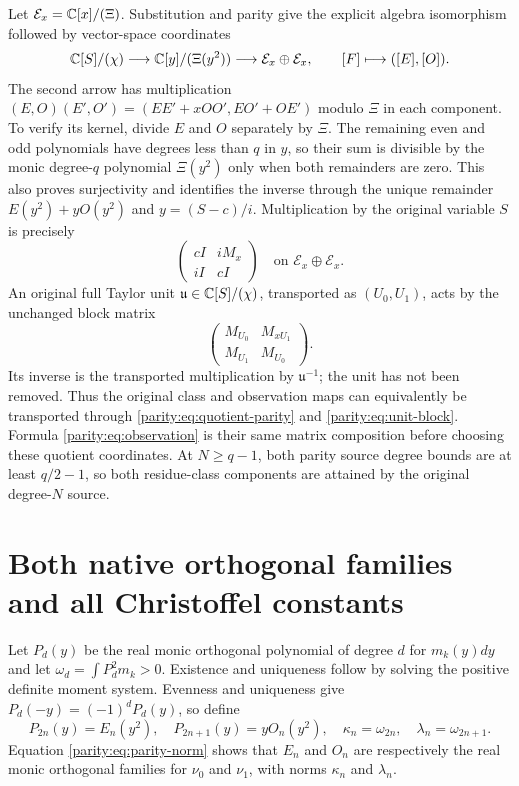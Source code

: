 \documentclass[11pt]{article}
\begin{document}
Let $\mathcal E_x=\mathbb C[x]/(\Xi)$. Substitution and parity give the
explicit algebra isomorphism followed by vector-space coordinates
\begin{equation}\label{parity:eq:quotient-parity}
 \mathbb C[S]/(\chi)\longrightarrow\mathbb C[y]/(\Xi(y^2))
                  \longrightarrow\mathcal E_x\oplus\mathcal E_x,
 \qquad [F]\longmapsto([E],[O]).
\end{equation}
The second arrow has multiplication
$(E,O)(E',O')=(EE'+xOO',EO'+OE')$ modulo $\Xi$ in each component.
To verify its kernel, divide $E$ and $O$ separately by $\Xi$.
The remaining even and odd polynomials have degrees less than
$q$ in $y$, so their sum is divisible by the monic degree-$q$
polynomial $\Xi(y^2)$ only when both remainders are zero. This
also proves surjectivity and identifies the inverse through the
unique remainder $E(y^2)+yO(y^2)$ and $y=(S-c)/i$.
Multiplication by the original variable $S$ is precisely
\begin{equation}\label{parity:eq:S-block}
 \begin{pmatrix}cI&iM_x\\ iI&cI\end{pmatrix}
 \quad\text{on }\mathcal E_x\oplus\mathcal E_x.
\end{equation}
An original full Taylor unit $\mathfrak u\in\mathbb C[S]/(\chi)$,
transported as $(U_0,U_1)$, acts by the unchanged block matrix
\begin{equation}\label{parity:eq:unit-block}
 \begin{pmatrix}M_{U_0}&M_{xU_1}\\M_{U_1}&M_{U_0}\end{pmatrix}.
\end{equation}
Its inverse is the transported multiplication by
$\mathfrak u^{-1}$; the unit has not been removed. Thus the
original class and observation maps can equivalently be
transported through \eqref{parity:eq:quotient-parity} and
\eqref{parity:eq:unit-block}. Formula \eqref{parity:eq:observation} is their
same matrix composition before choosing these quotient
coordinates. At $N\geq q-1$, both parity source degree bounds
are at least $q/2-1$, so both residue-class components are
attained by the original degree-$N$ source.

\section{Both native orthogonal families and all Christoffel constants}

Let $P_d(y)$ be the real monic orthogonal polynomial of degree $d$
for $m_k(y)dy$ and let $\omega_d=\int P_d^2m_k>0$. Existence and
uniqueness follow by solving the positive definite moment system.
Evenness and uniqueness give $P_d(-y)=(-1)^dP_d(y)$, so define
\[
 P_{2n}(y)=E_n(y^2),\quad P_{2n+1}(y)=yO_n(y^2),
 \quad \kappa_n=\omega_{2n},\quad\lambda_n=\omega_{2n+1}.
\]
Equation \eqref{parity:eq:parity-norm} shows that $E_n$ and $O_n$ are
respectively the real monic orthogonal families for $\nu_0$ and
$\nu_1$, with norms $\kappa_n$ and $\lambda_n$.
\end{document}
